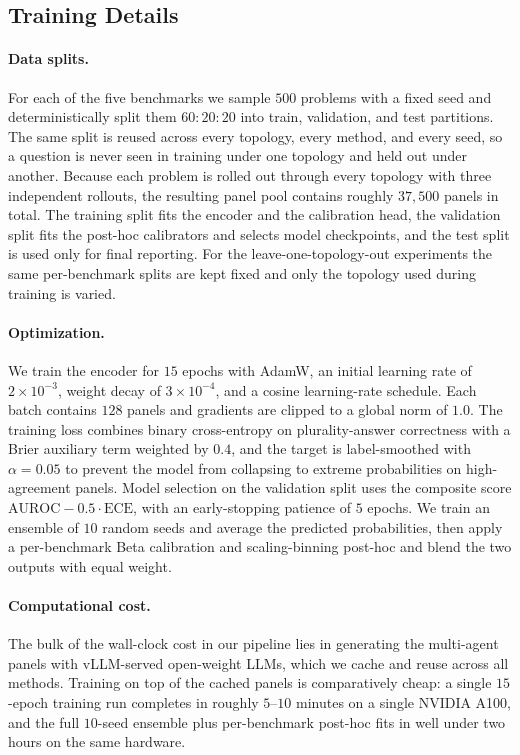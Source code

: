 \subsection{Training Details}
\paragraph{Data splits.}
For each of the five benchmarks we sample $500$ problems with a fixed seed and deterministically split them $60{:}20{:}20$ into train, validation, and test partitions. The same split is reused across every topology, every method, and every seed, so a question is never seen in training under one topology and held out under another. Because each problem is rolled out through every topology with three independent rollouts, the resulting panel pool
contains roughly $37{,}500$ panels in total. The training split fits the encoder and the calibration head, the validation split fits the post-hoc calibrators and selects model checkpoints, and the test split is used only for final reporting. For the leave-one-topology-out experiments the same per-benchmark splits are kept fixed and only the topology used during training is varied.

\paragraph{Optimization.}
We train the encoder for $15$ epochs with AdamW, an initial
learning rate of $2\!\times\!10^{-3}$, weight decay of
$3\!\times\!10^{-4}$, and a cosine learning-rate schedule. Each batch contains $128$ panels and gradients are clipped to a global norm of $1.0$. The training loss combines binary cross-entropy on plurality-answer correctness with a Brier auxiliary term weighted by $0.4$, and the target is label-smoothed with $\alpha=0.05$ to prevent the model from collapsing to extreme probabilities on high-agreement panels. Model selection on the validation split uses the composite score $\text{AUROC}-0.5\cdot\text{ECE}$, with an early-stopping patience of $5$ epochs. We train an ensemble of $10$
random seeds and average the predicted probabilities, then apply a per-benchmark Beta calibration and scaling-binning post-hoc and blend the two outputs with equal weight.

\paragraph{Computational cost.}
The bulk of the wall-clock cost in our pipeline lies in generating the multi-agent panels with vLLM-served open-weight LLMs, which we cache and reuse across all methods. Training \methodname{} on top of the cached panels is comparatively cheap: a single $15$-epoch training run completes in roughly $5$--$10$ minutes on a single
NVIDIA A100, and the full $10$-seed ensemble plus per-benchmark post-hoc fits in well under two hours on the same hardware.



